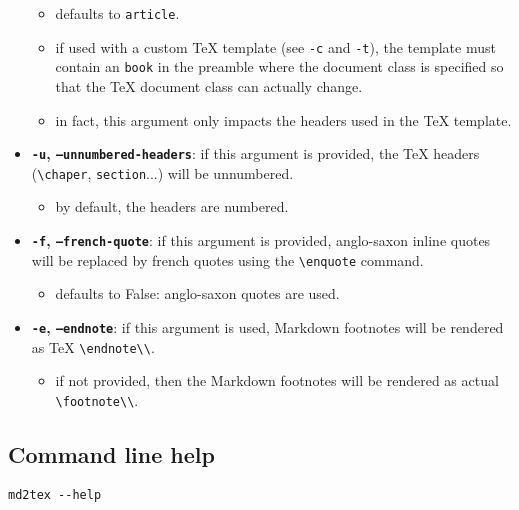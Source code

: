 \documentclass[a4paper, 12pt, twoside]{book}
\begin{document}
\begin{itemize}
\begin{itemize} 
 \item defaults to \texttt{article}.
\item if used with a custom TeX template (see \texttt{-c} and \texttt{-t}), the template must contain an \texttt{book} 	 in the preamble where the document class is specified so that the TeX document class can actually change.
\item in fact, this argument only impacts the headers used in the TeX template.
\end{itemize}
\item \textbf{\texttt{-u}, \texttt{--unnumbered-headers}}: if this argument is provided, the TeX headers (\texttt{\textbackslash{}chaper}, \texttt{section}...) will be unnumbered.
\begin{itemize} 
 \item by default, the headers are numbered.
\end{itemize}
\item \textbf{\texttt{-f}, \texttt{--french-quote}}: if this argument is provided, anglo-saxon inline quotes will be replaced by french quotes using the \texttt{\textbackslash{}enquote} command.
\begin{itemize} 
 \item defaults to False: anglo-saxon quotes are used.
\end{itemize}
\item \textbf{\texttt{-e}, \texttt{--endnote}}: if this argument is used, Markdown footnotes will be rendered as TeX \texttt{\textbackslash{}endnote\textbackslash{}{\textbackslash{}}}.
\begin{itemize} 
 \item if not provided, then the Markdown footnotes will be rendered as actual \texttt{\textbackslash{}footnote\textbackslash{}{\textbackslash{}}}. 
\end{itemize}
\end{itemize}
\subsection*{Command line help}

\begin{listing}[h!]
   \begin{verbatim}
md2tex --help

   \end{verbatim}
\end{listing}
\end{document}
